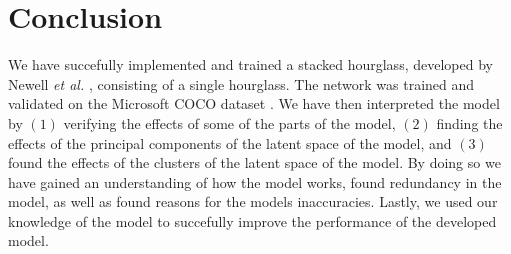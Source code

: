 \documentclass[./main.tex]{subfiles}
\begin{document}
\section{Conclusion}\label{sec:conclusion} 
We have succefully implemented and trained a stacked hourglass, developed by Newell \textit{et al.} \cite{Newell}, consisting of a single hourglass. The network was trained and validated on the Microsoft COCO dataset \cite{COCO_article}. We have then interpreted the model by $(1)$ verifying the effects of some of the parts of the model, $(2)$ finding the effects of the principal components of the latent space of the model, and $(3)$ found the effects of the clusters of the latent space of the model. By doing so we have gained an understanding of how the model works, found redundancy in the model, as well as found reasons for the models inaccuracies. Lastly, we used our knowledge of the model to succefully improve the performance of the developed model.
\end{document}
